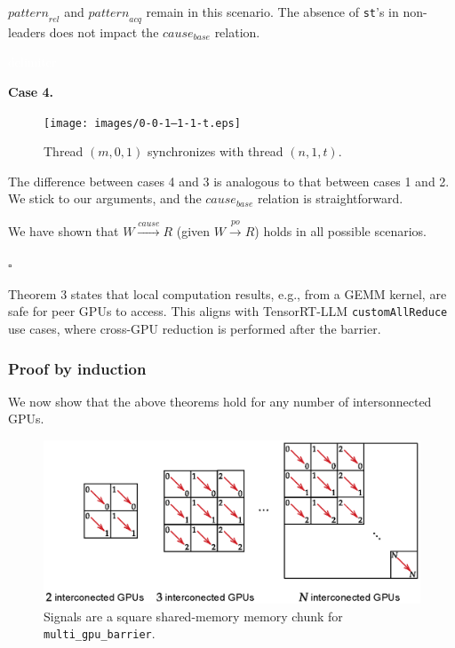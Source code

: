\documentclass[acmsmall]{acmart}
\begin{document}
${pattern}_{rel}$ and ${pattern}_{acq}$ remain in this scenario. The absence of \verb|st|'s in non-leaders does not impact the ${cause}_{base}$ relation.

\textcolor{white}{delimiter}

\noindent\textbf{Case 4.}

\begin{figure}[H]
    \centering
    \texttt{[image: images/0-0-1—1-1-t.eps]}
    \caption{Thread $(m, 0, 1)$ synchronizes with thread $(n, 1, t)$.}
    \label{fig:0-0-1—1-1-t}
\end{figure}

The difference between cases 4 and 3 is analogous to that between cases 1 and 2. We stick to our arguments, and the ${cause}_{base}$ relation is straightforward.

We have shown that $W \xrightarrow[]{cause} R$ (given $W \xrightarrow[]{po} R$) holds in all possible scenarios.

\begin{flushright}
$\square$
\end{flushright}

Theorem 3 states that local computation results, e.g., from a GEMM kernel, are safe for peer GPUs to access. This aligns with TensorRT-LLM \verb|customAllReduce| use cases, where cross-GPU reduction is performed after the barrier.

\subsubsection{Proof by induction}
\label{sec:induction}

We now show that the above theorems hold for any number of intersonnected GPUs.

\begin{figure}[H]
    \centering
    \includegraphics[width=0.75\linewidth]{images/induction.eps}
    \caption{Signals are a square shared-memory memory chunk for \texttt{multi\_gpu\_barrier}.}
    \label{fig:induction}
\end{figure}
\end{document}
